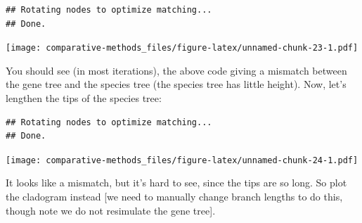\documentclass[]{article}
\newenvironment{Shaded}{\begin{snugshade}}{\end{snugshade}}
\newcommand{\DecValTok}[1]{\textcolor[rgb]{0.00,0.00,0.81}{#1}}
\newcommand{\KeywordTok}[1]{\textcolor[rgb]{0.13,0.29,0.53}{\textbf{#1}}}
\newcommand{\NormalTok}[1]{#1}
\newcommand{\OperatorTok}[1]{\textcolor[rgb]{0.81,0.36,0.00}{\textbf{#1}}}
\newcommand{\StringTok}[1]{\textcolor[rgb]{0.31,0.60,0.02}{#1}}
\begin{document}
\begin{verbatim}
## Rotating nodes to optimize matching...
## Done.
\end{verbatim}

\texttt{[image: comparative-methods\_files/figure-latex/unnamed-chunk-23-1.pdf]}

You should see (in most iterations), the above code giving a mismatch between the gene tree and the species tree (the species tree has little height). Now, let's lengthen the tips of the species tree:

\begin{Shaded}
\end{Shaded}

\begin{verbatim}
## Rotating nodes to optimize matching...
## Done.
\end{verbatim}

\texttt{[image: comparative-methods\_files/figure-latex/unnamed-chunk-24-1.pdf]}

It looks like a mismatch, but it's hard to see, since the tips are so long. So plot the cladogram instead {[}we need to manually change branch lengths to do this, though note we do not resimulate the gene tree{]}.

\begin{Shaded}
\end{Shaded}
\end{document}
